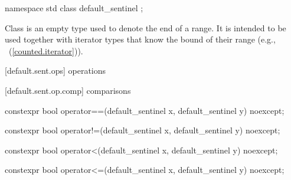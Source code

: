 \begin{addedblock}
{%
\begin{itemdecl}
namespace std {
  class default_sentinel { };
}
\end{itemdecl}

\pnum
Class  is an empty type used to denote the end of a
range. It is intended to be used together with iterator types that know the bound
of their range (e.g., ~(\ref{counted.iterator})).

[default.sent.ops]{ operations}

[default.sent.op.comp]{ comparisons}

%
%
\begin{itemdecl}
constexpr bool operator==(default_sentinel x, default_sentinel y) noexcept;
\end{itemdecl}

\begin{itemdescr}
\pnum
\returns {}
\end{itemdescr}

%
%
\begin{itemdecl}
constexpr bool operator!=(default_sentinel x, default_sentinel y) noexcept;
\end{itemdecl}

\begin{itemdescr}
\pnum
\returns {}
\end{itemdescr}

%
%
\begin{itemdecl}
constexpr bool operator<(default_sentinel x, default_sentinel y) noexcept;
\end{itemdecl}

\begin{itemdescr}
\pnum
\returns {}
\end{itemdescr}

%
%
\begin{itemdecl}
constexpr bool operator<=(default_sentinel x, default_sentinel y) noexcept;
\end{itemdecl}

}
\end{addedblock}
